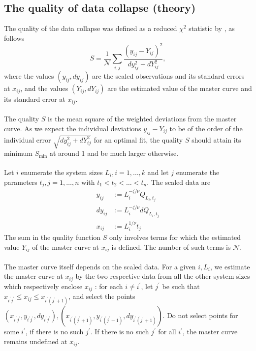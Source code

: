 \documentclass[../journal_main.tex]{subfiles}
\begin{document}
\subsection{The quality of data collapse (theory)}
The quality of the data collapse was defined as a reduced $\chi^2$ statistic by \cite{Houdayer_2004}, as follows 
\begin{equation}
    S = \frac{1}{\mathcal{N}} \sum_{i,j} \frac{(y_{ij} - Y_{ij})^2}{dy_{ij}^2 + dY_{ij}^2} ,
    \label{qualityfn}
\end{equation}
where the values $(y_{ij}, dy_{ij})$ are the scaled observations and its standard errors at $x_{ij}$, and the values $(Y_{ij}, dY_{ij})$ are the estimated value of the master curve and its standard error at $x_{ij}$.~\\~\\
The quality $S$ is the mean square of the weighted deviations from the master curve. As we expect the individual deviations $y_{i j}-Y_{i j}$ to be of the order of the individual error $\sqrt{d y_{i j}^{2}+d Y_{i j}^{2}}$ for an optimal fit, the quality $S$ should attain its minimum $S_{\min }$ at around 1 and be much larger otherwise.~\\~\\
Let $i$ enumerate the system sizes $L_{i}, i=1, \ldots, k$ and let $j$ enumerate the parameters $t_{j}, j=1, \ldots, n$ with $t_{1}<t_{2}<\ldots<t_{n}$. The scaled data are
$$
\begin{aligned}
y_{i j} &:=L_{i}^{-\zeta / \nu} Q_{L_{i}, t_{j}} \\
d y_{i j} &:=L_{i}^{-\zeta / \nu} d Q_{L_{i}, t_{j}} \\
x_{i j} &:=L_{i}^{1 / \nu} t_j
\end{aligned}
$$
The sum in the quality function $S$ only involves terms for which the estimated value $Y_{i j}$ of the master curve at $x_{i j}$ is defined. The number of such terms is $\mathcal{N}$.~\\~\\
The master curve itself depends on the scaled data. For a given $i, L_{i}$, we estimate the master curve at $x_{i j}$ by the two respective data from all the other system sizes which respectively enclose $x_{i j}$ : for each $i \neq i^\prime$, let $j^{\prime}$ be such that $x_{i^{\prime} j^{\prime}} \leq x_{i j} \leq x_{i^{\prime}\left(j^{\prime}+1\right)}$, and select the points $\left(x_{i^{\prime} j^{\prime}}, y_{i^{\prime} j^{\prime}}, d y_{i^{\prime} j^{\prime}}\right),\left(x_{i^{\prime}\left(j^{\prime}+1\right)}, y_{i^{\prime}\left(j^{\prime}+1\right)}, d y_{i^{\prime}\left(j^{\prime}+1\right)}\right)$. Do not select points for some $i^{\prime}$, if there is no such $j^{\prime}$. If there is no such $j^{\prime}$ for all $i^{\prime}$, the master curve remains undefined at $x_{i j}$.~\\~\\
\end{document}
